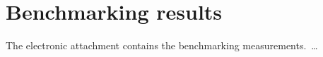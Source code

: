 \chapter{Benchmarking results}\label{app:data}

The electronic attachment contains the benchmarking measurements.\ \ldots
